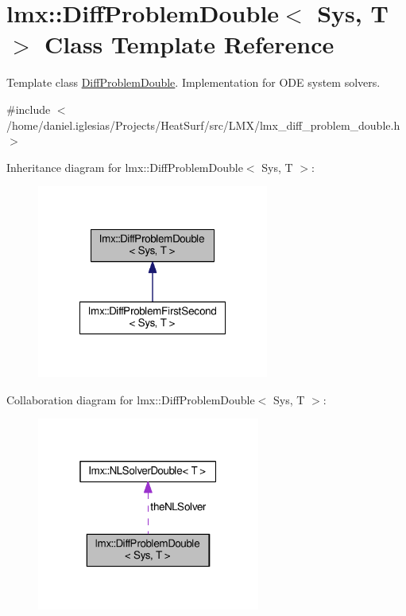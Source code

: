 \hypertarget{classlmx_1_1DiffProblemDouble}{\section{lmx\-:\-:Diff\-Problem\-Double$<$ Sys, T $>$ Class Template Reference}
\label{classlmx_1_1DiffProblemDouble}
}


Template class \hyperlink{classlmx_1_1DiffProblemDouble}{Diff\-Problem\-Double}. Implementation for O\-D\-E system solvers.  




{\ttfamily \#include $<$/home/daniel.\-iglesias/\-Projects/\-Heat\-Surf/src/\-L\-M\-X/lmx\-\_\-diff\-\_\-problem\-\_\-double.\-h$>$}



Inheritance diagram for lmx\-:\-:Diff\-Problem\-Double$<$ Sys, T $>$\-:
\nopagebreak
\begin{figure}[H]
\begin{center}
\leavevmode
\includegraphics[width=216pt]{classlmx_1_1DiffProblemDouble__inherit__graph}
\end{center}
\end{figure}


Collaboration diagram for lmx\-:\-:Diff\-Problem\-Double$<$ Sys, T $>$\-:
\nopagebreak
\begin{figure}[H]
\begin{center}
\leavevmode
\includegraphics[width=208pt]{classlmx_1_1DiffProblemDouble__coll__graph}
\end{center}
\end{figure}
